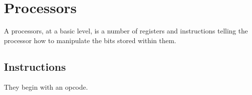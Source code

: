 \chapter{Processors}

A processors, at a basic level, is a number of registers and instructions
telling the processor how to manipulate the bits stored within them.

\section{Instructions}

They begin with an opcode.
